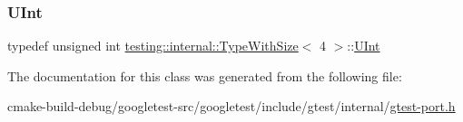 \subsubsection{\texorpdfstring{UInt}{UInt}}
{\footnotesize\ttfamily typedef unsigned int \mbox{\hyperlink{classtesting_1_1internal_1_1TypeWithSize}{testing\+::internal\+::\+Type\+With\+Size}}$<$ 4 $>$\+::\mbox{\hyperlink{classtesting_1_1internal_1_1TypeWithSize_3_014_01_4_a7d559570f830bf35d095eeb94d98de58}{U\+Int}}}



The documentation for this class was generated from the following file\+:\begin{DoxyCompactItemize}
\item 
cmake-\/build-\/debug/googletest-\/src/googletest/include/gtest/internal/\mbox{\hyperlink{gtest-port_8h}{gtest-\/port.\+h}}\end{DoxyCompactItemize}
